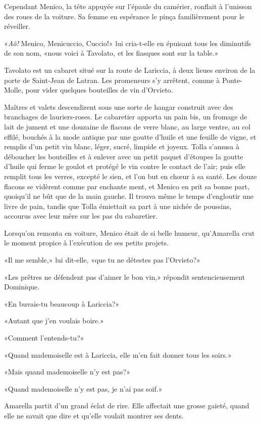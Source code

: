 Cependant Menico, la tête appuyée sur l'épaule du camérier, ronflait à
l'unisson des roues de la voiture. Sa femme en espérance le pinça
familièrement pour le réveiller.

«\emph{Aô!} Menico, Menicuccio, Cuccio!» lui cria-t-elle en épuisant
tous les diminutifs de son nom, «nous voici à Tavolato, et les fiasques
sont sur la table.»

Tavolato est un cabaret situé sur la route de Lariccia, à deux lieues
environ de la porte de Saint-Jean de Latran. Les promeneurs s'y
arrêtent, comme à Ponte-Molle, pour vider quelques bouteilles de vin
d'Orvieto.

Maîtres et valets descendirent sous une sorte de hangar construit avec
des branchages de lauriers-roses. Le cabaretier apporta un pain bis, un
fromage de lait de jument et une douzaine de flacons de verre blanc, au
large ventre, au col effilé, bouchés à la mode antique par une goutte
d'huile et une feuille de vigne, et remplis d'un petit vin blanc, léger,
sucré, limpide et joyeux. Tolla s'amusa à déboucher les bouteilles et à
enlever avec un petit paquet d'étoupes la goutte d'huile qui ferme le
goulot et protégé le vin contre le contact de l'air; puis elle remplit
tous les verres, excepté le sien, et l'on but en chœur à sa santé. Les
douze flacons se vidèrent comme par enchante ment, et Menico en prit sa
bonne part, quoiqu'il ne bût que de la main gauche. Il trouva même le
temps d'engloutir une livre de pain, tandis que Tolla émiettait sa part
à une nichée de poussins, accourus avec leur mère sur les pas du
cabaretier.

Lorsqu'on remonta en voiture, Menico était de si belle humeur,
qu'Amarella crut le moment propice à l'exécution de ses petits projets.

«Il me semble,» lui dit-elle, «que tu ne détestes pas l'Orvieto?»

«Les prêtres ne défendent pas d'aimer le bon vin,» répondit
sentencieusement Dominique.

«En buvais-tu beaucoup à Lariccia?»

«Autant que j'en voulais boire.»

«Comment l'entends-tu?»

«Quand mademoiselle est à Lariccia, elle m'en fait donner tous les
soirs.»

«Mais quand mademoiselle n'y est pas?»

«Quand mademoiselle n'y est pas, je n'ai pas soif.»

Amarella partit d'un grand éclat de rire. Elle affectait une grosse
gaieté, quand elle ne savait que dire et qu'elle voulait montrer ses
dents.

